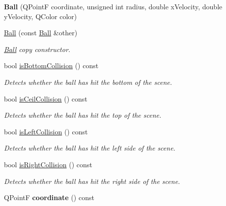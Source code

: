 \begin{DoxyCompactItemize}
\item 
\hypertarget{class_ball_a5a588a1c1c218aa5f6d8578801da719a}{{\bfseries Ball} (Q\+Point\+F coordinate, unsigned int radius, double x\+Velocity, double y\+Velocity, Q\+Color color)}\label{class_ball_a5a588a1c1c218aa5f6d8578801da719a}

\item 
\hyperlink{class_ball_acff1695dfbb0dd58a5356efef558182d}{Ball} (const \hyperlink{class_ball}{Ball} \&other)
\begin{DoxyCompactList}\small\item\em \hyperlink{class_ball}{Ball} copy constructor. \end{DoxyCompactList}\item 
bool \hyperlink{class_ball_a2252d47f1db0da83386d82f7b5e59c0f}{is\+Bottom\+Collision} () const 
\begin{DoxyCompactList}\small\item\em Detects whether the ball has hit the bottom of the scene. \end{DoxyCompactList}\item 
bool \hyperlink{class_ball_ab40a04388b295fea9a2e6e682b99bfdc}{is\+Ceil\+Collision} () const 
\begin{DoxyCompactList}\small\item\em Detects whether the ball has hit the top of the scene. \end{DoxyCompactList}\item 
bool \hyperlink{class_ball_a6f691389189d6799de693fbfaf3324e4}{is\+Left\+Collision} () const 
\begin{DoxyCompactList}\small\item\em Detects whether the ball has hit the left side of the scene. \end{DoxyCompactList}\item 
bool \hyperlink{class_ball_a68aa186abe6ef475588bfed3f3eb83de}{is\+Right\+Collision} () const 
\begin{DoxyCompactList}\small\item\em Detects whether the ball has hit the right side of the scene. \end{DoxyCompactList}\item 
\hypertarget{class_ball_aaf64ce0df64b577edaaa677cd8b5b961}{Q\+Point\+F {\bfseries coordinate} () const }\label{class_ball_aaf64ce0df64b577edaaa677cd8b5b961}


\end{DoxyCompactItemize}
